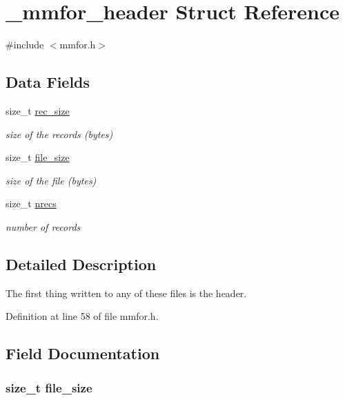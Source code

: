 \hypertarget{struct__mmfor__header}{\section{\-\_\-mmfor\-\_\-header Struct Reference}
\label{struct__mmfor__header}
}


{\ttfamily \#include $<$mmfor.\-h$>$}

\subsection*{Data Fields}
\begin{DoxyCompactItemize}
\item 
size\-\_\-t \hyperlink{struct__mmfor__header_a6af15626e40c23bd7d5b67f5a54c8344}{rec\-\_\-size}
\begin{DoxyCompactList}\small\item\em size of the records (bytes) \end{DoxyCompactList}\item 
size\-\_\-t \hyperlink{struct__mmfor__header_a14ba597917108e3c1937893de7c4ac0c}{file\-\_\-size}
\begin{DoxyCompactList}\small\item\em size of the file (bytes) \end{DoxyCompactList}\item 
size\-\_\-t \hyperlink{struct__mmfor__header_a218d36060722882d76c8d10b73edb6a6}{nrecs}
\begin{DoxyCompactList}\small\item\em number of records \end{DoxyCompactList}\end{DoxyCompactItemize}


\subsection{Detailed Description}
The first thing written to any of these files is the header. 

Definition at line 58 of file mmfor.\-h.



\subsection{Field Documentation}
\hypertarget{struct__mmfor__header_a14ba597917108e3c1937893de7c4ac0c}{
\subsubsection[{file\-\_\-size}]{\setlength{\rightskip}{0pt plus 5cm}size\-\_\-t file\-\_\-size}}\label{struct__mmfor__header_a14ba597917108e3c1937893de7c4ac0c}


